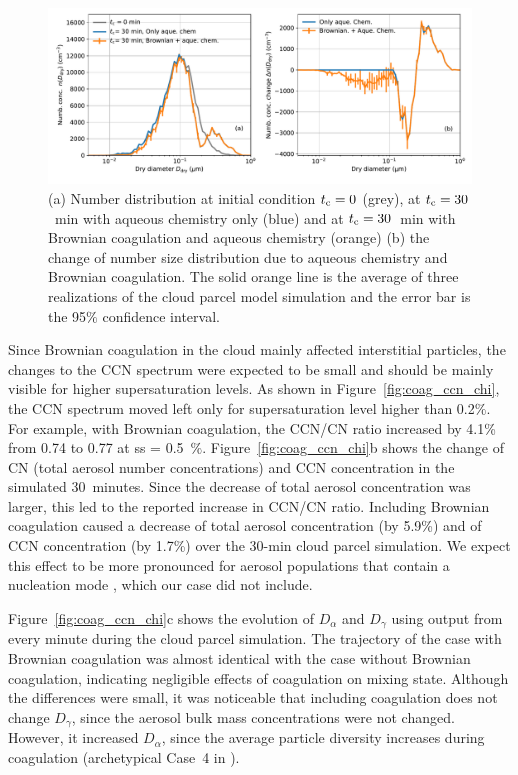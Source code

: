 \documentclass[edeposit,fullpage]{uiucthesis2009}
\begin{document}
\begin{figure}
    \centering
    \includegraphics[scale=0.45]{chap3_figs/fig12.pdf}
    \caption{(a) Number distribution at initial condition $t_{\rm c} =
      0$ (grey), at $t_{\rm c} = 30$~min with aqueous chemistry only
      (blue) and at $t_{\rm c} = 30$~min with Brownian coagulation and
      aqueous chemistry (orange) (b) the change of number size
      distribution due to aqueous chemistry and Brownian
      coagulation. The solid orange line is the average of three
      realizations of the cloud parcel model simulation and the error
      bar is the 95$\%$ confidence interval.}
    \label{fig:coag_num_brown}
\end{figure}

Since Brownian coagulation in the cloud mainly affected interstitial
particles, the changes to the CCN spectrum were expected to be small
and should be mainly visible for higher supersaturation levels. As
shown in Figure~\ref{fig:coag_ccn_chi}, the CCN spectrum moved left
only for supersaturation level higher than 0.2$\%$.  For example, with
Brownian coagulation, the CCN/CN ratio increased by 4.1\% from 0.74 to
0.77 at ss = 0.5~$\%$. Figure~\ref{fig:coag_ccn_chi}b shows the change
of CN (total aerosol number concentrations) and CCN concentration in
the simulated 30~minutes. Since the decrease of total aerosol
concentration was larger, this led to the reported increase in CCN/CN
ratio. Including Brownian coagulation caused a decrease of
  total aerosol concentration (by 5.9\%) and of CCN concentration (by
  1.7\%) over the 30-min cloud parcel simulation. We expect this
  effect to be more pronounced for aerosol populations that contain a
  nucleation mode \citep{romakkaniemi2006influence}, which our case did
  not include.

Figure~\ref{fig:coag_ccn_chi}c shows the evolution of $D_{\alpha}$
and $D_{\gamma}$ using output from every minute during the cloud
parcel simulation. The trajectory of the case with Brownian
coagulation was almost identical with the case without Brownian
coagulation, indicating negligible effects of coagulation on mixing
state. Although the differences were small, it was noticeable that
including coagulation does not change $D_{\gamma}$, since the aerosol
bulk mass concentrations were not changed. However, it increased
$D_{\alpha}$, since the average particle diversity increases during
coagulation (archetypical Case~4 in \citet{Riemer2013a}).
\end{document}
